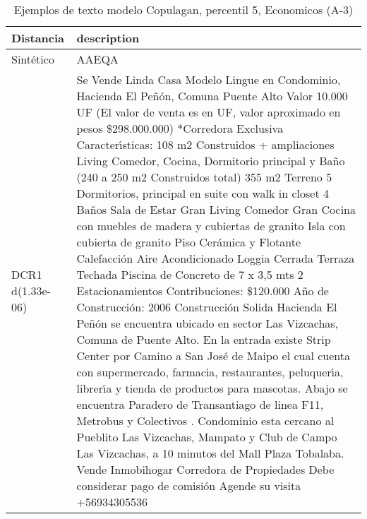 \begin{table}[H]
\centering
\fontsize{10}{14}\selectfont
\caption{Ejemplos de texto modelo Copulagan, percentil 5, Economicos (A-3)}
\label{table-example-economicos-a-3-copulagan-5p-text}
\begin{tabular}{|l|m{35em}|}
\hline
\rowcolor[gray]{0.8}
Distancia & description \\
\hline Sintético & AAEQA \\
\hline DCR1 d(1.33e-06) & Se Vende Linda Casa Modelo Lingue en Condominio, Hacienda El Pe\~n\'on, Comuna Puente Alto  Valor 10.000 UF (El valor de venta es en UF, valor aproximado en pesos \$298.000.000) *Corredora Exclusiva  Caracter{\'\i}sticas: 108 m2 Construidos + ampliaciones Living Comedor, Cocina, Dormitorio principal y Ba\~no (240 a 250 m2 Construidos total) 355 m2 Terreno  5 Dormitorios, principal en suite con walk in closet 4 Ba\~nos Sala de Estar Gran Living Comedor Gran Cocina con muebles de madera y cubiertas de granito Isla con cubierta de granito  Piso Cer\'amica y Flotante Calefacci\'on Aire Acondicionado Loggia Cerrada Terraza Techada Piscina de Concreto de 7 x 3,5 mts 2 Estacionamientos  Contribuciones: \$120.000 A\~no de Construcci\'on: 2006 Construcci\'on Solida  Hacienda El Pe\~n\'on se encuentra ubicado en sector Las Vizcachas, Comuna de Puente Alto.  En la entrada existe Strip Center por Camino a San Jos\'e de Maipo el cual cuenta con supermercado, farmacia, restaurantes, peluquer{\'\i}a, librer{\'\i}a y tienda de productos para mascotas.  Abajo se encuentra Paradero de Transantiago de linea F11, Metrobus y Colectivos . Condominio esta cercano al Pueblito Las Vizcachas, Mampato y Club de Campo Las Vizcachas, a 10 minutos del Mall Plaza Tobalaba.  Vende Inmobihogar Corredora de Propiedades Debe considerar pago de comisi\'on  Agende su visita +56934305536 \\

\end{tabular}
\end{table}
